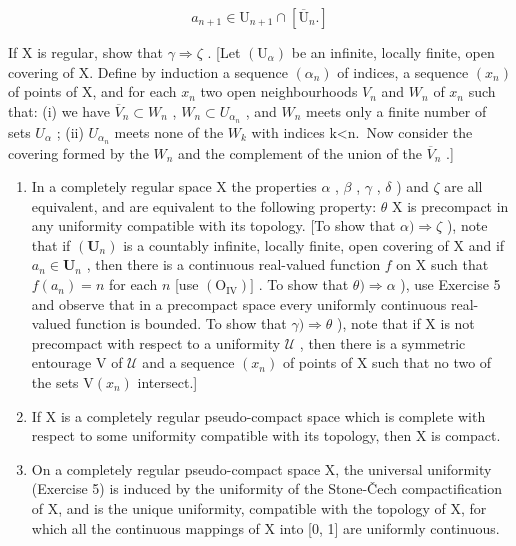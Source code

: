 \[
a _ {n + 1} \in \mathrm{U} _ {n + 1} \cap \left[ \overline {{\mathrm{U}}} _ {n}. \right]
\]

If X is regular, show that \(\gamma\Longrightarrow\zeta\) . {[}Let \((\mathrm{U}_{\alpha})\) be an infinite, locally finite, open covering of X. Define by induction a sequence \((\alpha_{n})\) of indices, a sequence \((x_{n})\) of points of X, and for each \(x_{n}\) two open neighbourhoods \(V_{n}\) and \(W_{n}\) of \(x_{n}\) such that: (i) we have \(\overline{V}_{n}\subset W_{n}\) , \(W_{n}\subset U_{\alpha_{n}}\) , and \(W_{n}\) meets only a finite number of sets \(U_{\alpha}\) ; (ii) \(U_{\alpha_{n}}\) meets none of the \(W_{k}\) with indices k\textless n.~Now consider the covering formed by the \(W_{n}\) and the complement of the union of the \(\overline{V}_{n}\) .{]}

\begin{enumerate}
\def\labelenumi{\alph{enumi})}
\setcounter{enumi}{3}
\item
  In a completely regular space X the properties \(\alpha\) , \(\beta\) , \(\gamma\) , \(\delta\) ) and \(\zeta\) are all equivalent, and are equivalent to the following property: \(\theta\) X is precompact in any uniformity compatible with its topology. {[}To show that \(\alpha) \Longrightarrow \zeta\) ), note that if \((\mathbf{U}_n)\) is a countably infinite, locally finite, open covering of X and if \(a_n \in \mathbf{U}_n\) , then there is a continuous real-valued function \(f\) on X such that \(f(a_n) = n\) for each \(n\) {[}use \((\mathrm{O}_{\mathrm{IV}})]\) . To show that \(\theta) \Longrightarrow \alpha\) ), use Exercise 5 and observe that in a precompact space every uniformly continuous real-valued function is bounded. To show that \(\gamma) \Longrightarrow \theta\) ), note that if X is not precompact with respect to a uniformity \(\mathcal{U}\) , then there is a symmetric entourage V of \(\mathcal{U}\) and a sequence \((x_n)\) of points of X such that no two of the sets \(\mathrm{V}(x_n)\) intersect.{]}
\item
  If X is a completely regular pseudo-compact space which is complete with respect to some uniformity compatible with its topology, then X is compact.
\item
  On a completely regular pseudo-compact space X, the universal uniformity (Exercise 5) is induced by the uniformity of the Stone-Čech compactification of X, and is the unique uniformity, compatible with the topology of X, for which all the continuous mappings of X into {[}0, 1{]} are uniformly continuous.
\end{enumerate}

